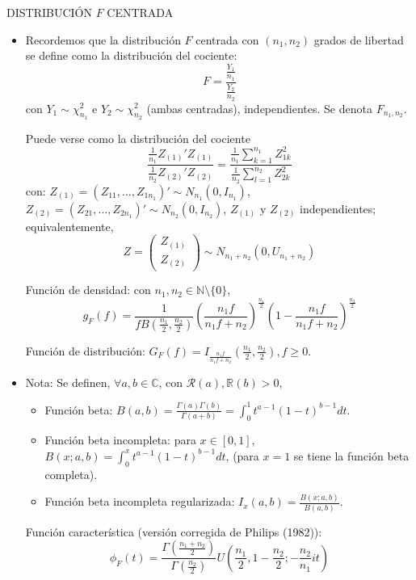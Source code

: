 \documentclass[11pt,a4paper]{article}
\begin{document}
DISTRIBUCIÓN $F$ CENTRADA
\begin{itemize}
\item Recordemos que la distribución $F$ centrada con $(n_{1}, n_{2})$ grados de libertad se define como la distribución del cociente:
$$F = \frac{\frac{Y_{1}}{n_{1}}}{\frac{Y_{2}}{n_{2}}}$$
con $Y_{1} \sim \chi_{n_{1}}^{2}$ e $Y_{2} \sim \chi_{n_{2}}^{2}$ (ambas centradas), independientes. Se denota $F_{n_{1}, n_{2}}$.

Puede verse como la distribución del cociente
$$\frac{\frac{1}{n_{1}}Z_{(1)}'Z_{(1)}}{\frac{1}{n_{2}}Z_{(2)}'Z_{(2)}} = \frac{\frac{1}{n_{1}} \sum_{k=1}^{n_{1}} Z_{1k}^{2}}{\frac{1}{n_{2}} \sum_{l=1}^{n_{2}} Z_{2k}^{2}}$$
con: $Z_{(1)} = (Z_{11}, \dots, Z_{1n_{1}})' \sim N_{n_{1}}(0, I_{n_{1}})$, $Z_{(2)} = (Z_{21}, \dots, Z_{2n_{1}})' \sim N_{n_{2}}(0, I_{n_{2}})$, $Z_{(1)}$ y $Z_{(2)}$ independientes; equivalentemente,
$$Z = \begin{pmatrix} Z_{(1)} \\ Z_{(2)} \end{pmatrix} \sim N_{n_{1} + n_{2}}(0, U_{n_{1} + n_{2}})$$

Función de densidad: con $n_{1}, n_{2} \in \mathbb{N} \setminus \{0\}$,
$$g_{F}(f) = \frac{1}{fB(\frac{n_{1}}{2}, \frac{n_{2}}{2})} (\frac{n_{1}f}{n_{1}f + n_{2}})^{\frac{n_{1}}{2}} (1 - \frac{n_{1}f}{n_{1}f+n_{2}})^{\frac{n_{2}}{2}}$$

Función de distribución: $G_{F}(f) = I_{\frac{n_{1}f}{n_{1}f+n_{2}}} (\frac{n_{1}}{2}, \frac{n_{2}}{2}), f \geq 0$.

\item Nota: Se definen, $\forall a, b \in \mathbb{C}$, con $\mathcal{R}(a), \mathbb{R}(b) > 0$,
\begin{itemize}
\item Función beta: $B(a,b) = \frac{\Gamma(a)\Gamma(b)}{\Gamma(a+b)} = \int_{0}^{1} t^{a-1} (1-t)^{b-1} dt$.

\item Función beta incompleta: para $x \in [0,1]$, $B(x;a,b) = \int_{0}^{x} t^{a-1} (1-t)^{b-1} dt$, (para $x = 1$ se tiene la función beta completa).

\item Función beta incompleta regularizada: $I_{x}(a,b) = \frac{B(x;a,b)}{B(a,b)}$.
\end{itemize}

Función característica (versión corregida de Philips (1982)):
$$\phi_{F}(t) = \frac{\Gamma(\frac{n_{1} + n_{2}}{2})}{\Gamma(\frac{n_{2}}{2})} U(\frac{n_{1}}{2}, 1 - \frac{n_{2}}{2}; -\frac{n_{2}}{n_{1}}it)$$


\end{itemize}
\end{document}
